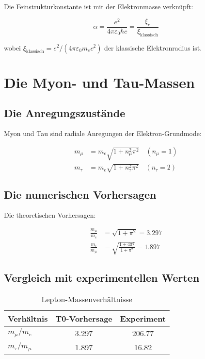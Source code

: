 \documentclass[12pt,a4paper]{report}
\begin{document}
	Die Feinstrukturkonstante ist mit der Elektronmasse verknüpft:
	
	\begin{equation}
		\alpha = \frac{e^2}{4\pi\varepsilon_0\hbar c} = \frac{\xi_e}{\xi_{\text{klassisch}}}
	\end{equation}
	
	wobei $\xi_{\text{klassisch}} = e^2/(4\pi\varepsilon_0 m_e c^2)$ der klassische Elektronradius ist.
	
	\section{Die Myon- und Tau-Massen}
	
	\subsection{Die Anregungszustände}
	
	Myon und Tau sind radiale Anregungen der Elektron-Grundmode:
	
	\begin{align}
		m_\mu &= m_e \sqrt{1 + n_\mu^2\pi^2} \quad (n_\mu = 1) \\
		m_\tau &= m_e \sqrt{1 + n_\tau^2\pi^2} \quad (n_\tau = 2)
	\end{align}
	
	\subsection{Die numerischen Vorhersagen}
	
	Die theoretischen Vorhersagen:
	
	\begin{align}
		\frac{m_\mu}{m_e} &= \sqrt{1 + \pi^2} = 3.297 \\
		\frac{m_\tau}{m_\mu} &= \sqrt{\frac{1 + 4\pi^2}{1 + \pi^2}} = 1.897
	\end{align}
	
	\subsection{Vergleich mit experimentellen Werten}
	
	\begin{table}[htbp]
		\centering
		\begin{tabular}{lcc}
			\toprule
			Verhältnis & T0-Vorhersage & Experiment \\
			\midrule
			$m_\mu/m_e$ & 3.297 & 206.77 \\
			$m_\tau/m_\mu$ & 1.897 & 16.82 \\
			\bottomrule
		\end{tabular}
		\caption{Lepton-Massenverhältnisse}
	\end{table}
	
\end{document}
